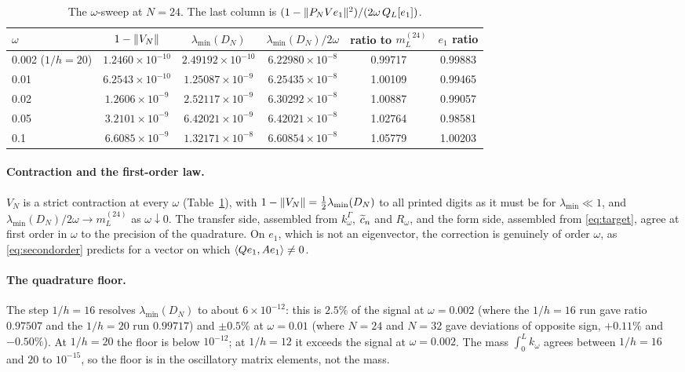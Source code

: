 \begin{table}[ht]\centering\small
\caption{The $\omega$-sweep at $N=24$. The last column is
$(1-\lVert P_NVe_1\rVert^2)/(2\omega\,Q_L[e_1])$.}\label{tab:sweep}
\begin{tabular}{@{}lccccc@{}}
\toprule
$\omega$ & $1-\lVert V_N\rVert$ & $\lambda_{\min}(D_N)$ & $\lambda_{\min}(D_N)/2\omega$ & ratio to $m_L^{(24)}$ & $e_1$ ratio\\
\midrule
0.002 ($1/h=20$) & $1.2460\times10^{-10}$ & $2.49192\times10^{-10}$ & $6.22980\times10^{-8}$ & 0.99717 & 0.99883\\
0.01 & $6.2543\times10^{-10}$ & $1.25087\times10^{-9}$ & $6.25435\times10^{-8}$ & 1.00109 & 0.99465\\
0.02 & $1.2606\times10^{-9}$ & $2.52117\times10^{-9}$ & $6.30292\times10^{-8}$ & 1.00887 & 0.99057\\
0.05 & $3.2101\times10^{-9}$ & $6.42021\times10^{-9}$ & $6.42021\times10^{-8}$ & 1.02764 & 0.98581\\
0.1 & $6.6085\times10^{-9}$ & $1.32171\times10^{-8}$ & $6.60854\times10^{-8}$ & 1.05779 & 1.00203\\
\bottomrule
\end{tabular}
\end{table}

\paragraph{Contraction and the first-order law.} $V_N$ is a strict contraction
at every $\omega$ (Table~\ref{tab:sweep}), with $1-\lVert V_N\rVert=\frac12\lambda_{\min}(D_N)$
to all printed digits as it must be for $\lambda_{\min}\ll1$, and
$\lambda_{\min}(D_N)/2\omega\to m_L^{(24)}$ as $\omega\downarrow0$. The transfer
side, assembled from $k^\Gamma_\omega$, $\widetilde c_n$ and $R_\omega$, and the form
side, assembled from \eqref{eq:target}, agree at first order in $\omega$ to the
precision of the quadrature. On $e_1$, which is not an eigenvector, the
correction is genuinely of order $\omega$, as \eqref{eq:secondorder} predicts
for a vector on which $\langle Qe_1,Ae_1\rangle\neq0$.

\paragraph{The quadrature floor.} The step $1/h=16$ resolves
$\lambda_{\min}(D_N)$ to about $6\times10^{-12}$: this is $2.5\%$ of the signal
at $\omega=0.002$ (where the $1/h=16$ run gave ratio $0.97507$ and the
$1/h=20$ run $0.99717$) and $\pm0.5\%$ at $\omega=0.01$ (where $N=24$ and
$N=32$ gave deviations of opposite sign, $+0.11\%$ and $-0.50\%$). At $1/h=20$
the floor is below $10^{-12}$; at $1/h=12$ it exceeds the signal at
$\omega=0.002$. The mass $\int_0^Lk_\omega$ agrees between $1/h=16$ and $20$ to
$10^{-15}$, so the floor is in the oscillatory matrix elements, not the mass.


